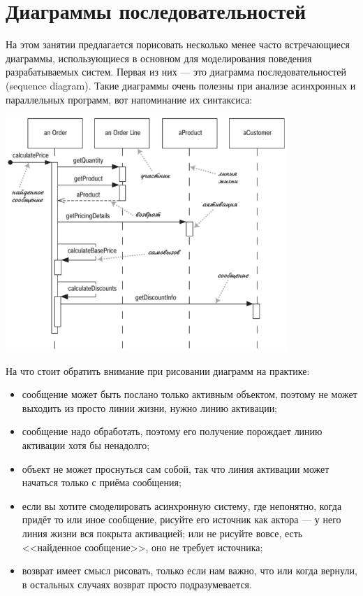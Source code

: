 \documentclass{../mcstext}
\begin{document}
\maketitle
\thispagestyle{empty}

\section{Диаграммы последовательностей}

На этом занятии предлагается порисовать несколько менее часто встречающиеся диаграммы, использующиеся в основном для моделирования поведения разрабатываемых систем. Первая из них --- это диаграмма последовательностей (sequence diagram). Такие диаграммы очень полезны при анализе асинхронных и параллельных программ, вот напоминание их синтаксиса:

\begin{center}
    \includegraphics[width=0.8\textwidth]{sequenceDiagram.png}
\end{center}

На что стоит обратить внимание при рисовании диаграмм на практике:

\begin{itemize}
    \item сообщение может быть послано только активным объектом, поэтому не может выходить из просто линии жизни, нужно линию активации;
    \item сообщение надо обработать, поэтому его получение порождает линию активации хотя бы ненадолго;
    \item объект не может проснуться сам собой, так что линия активации может начаться только с приёма сообщения;
    \item если вы хотите смоделировать асинхронную систему, где непонятно, когда придёт то или иное сообщение, рисуйте его источник как актора --- у него линия жизни вся покрыта активацией; или не рисуйте вовсе, есть <<найденное сообщение>>, оно не требует источника;
    \item возврат имеет смысл рисовать, только если нам важно, что или когда вернули, в остальных случаях возврат просто подразумевается.
\end{itemize}
\end{document}
